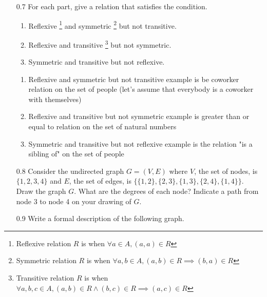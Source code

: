 \begin{enumerate}
    \item[0.7]
For each part, give a relation that satisfies the condition.
\begin{enumerate}
    \item  Reflexive
    \footnote{Reflexive relation $R$ is when $\forall a \in A, (a, a) \in R$} and symmetric
    \footnote{Symmetric relation $R$ is when $\forall a, b \in A, (a, b) \in R \implies (b, a) \in R$} but not transitive.
    \item  Reflexive and transitive
    \footnote{Transitive relation $R$ is when $\forall a, b, c \in A, (a, b) \in R \land (b, c) \in R \implies (a, c) \in R$} but not symmetric.
    \item  Symmetric and transitive but not reflexive.
\end{enumerate}

\begin{enumerate}

    \item Reflexive and symmetric but not transitive example is be coworker relation on the set of people (let's assume that everybody is a coworker with themselves)
    \item Reflexive and transitive but not symmetric example is greater than or equal to relation on the set of natural numbers
    \item Symmetric and transitive but not reflexive example is the relation "is a sibling of" on the set of people
\end{enumerate}

    \item[0.8]
Consider the undirected graph $G = (V, E)$ where $V$, the set of nodes, is $\{1, 2, 3, 4\}$ and $E$, the set of edges, is $\{\{1, 2\}, \{2, 3\}, \{1, 3\}, \{2, 4\}, \{1, 4\}\}$. Draw the graph $G$. What are the degrees of each node? Indicate a path from node 3 to node 4 on your drawing of $G$.


    \item[0.9]
Write a formal description of the following graph.


\end{enumerate}
